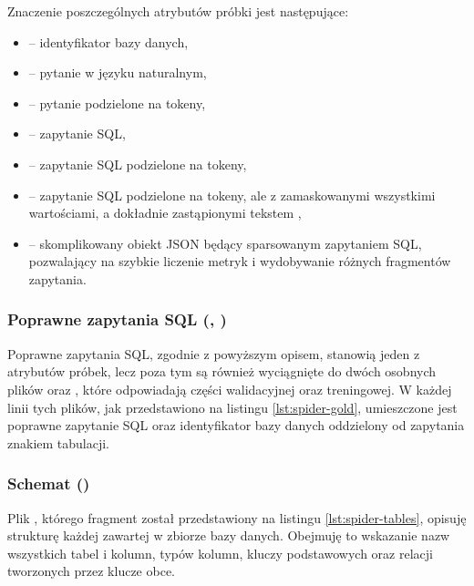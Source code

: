 \begin{minipage}{\linewidth}

\end{minipage}

Znaczenie poszczególnych atrybutów próbki jest następujące:\nobreakpar
\begin{itemize}
    \item \textbf{} -- identyfikator bazy danych,
    \item \textbf{} -- pytanie w języku naturalnym,
    \item \textbf{} -- pytanie podzielone na tokeny,
    \item \textbf{} -- zapytanie SQL,
    \item \textbf{} -- zapytanie SQL podzielone na tokeny,
    \item \textbf{} -- zapytanie SQL podzielone na tokeny, ale z zamaskowanymi wszystkimi wartościami, a dokładnie zastąpionymi tekstem ,
    \item \textbf{} -- skomplikowany obiekt JSON będący sparsowanym zapytaniem SQL, pozwalający na szybkie liczenie metryk i wydobywanie różnych fragmentów zapytania.
\end{itemize}

\subsubsection{Poprawne zapytania SQL (, )}
Poprawne zapytania SQL, zgodnie z powyższym opisem, stanowią jeden z atrybutów próbek, lecz poza tym są również wyciągnięte do dwóch osobnych plików  oraz , które odpowiadają części walidacyjnej oraz treningowej. W każdej linii tych plików, jak przedstawiono na listingu \ref{lst:spider-gold}, umieszczone jest poprawne zapytanie SQL oraz identyfikator bazy danych oddzielony od zapytania znakiem tabulacji.

\begin{minipage}{\linewidth}

\end{minipage}

\subsubsection{Schemat ()}
Plik , którego fragment został przedstawiony na listingu \ref{lst:spider-tables}, opisuję strukturę każdej zawartej w zbiorze  bazy danych. Obejmuję to wskazanie nazw wszystkich tabel i kolumn, typów kolumn, kluczy podstawowych oraz relacji tworzonych przez klucze obce. 

